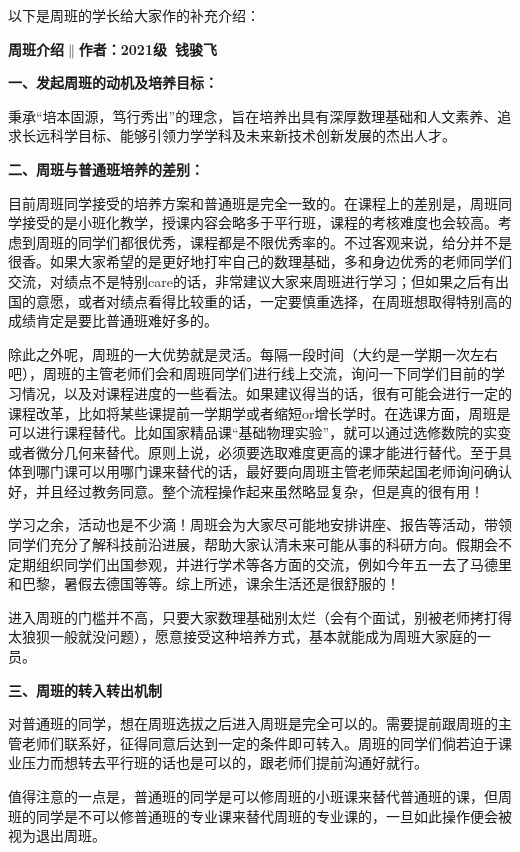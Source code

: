 \documentclass[11pt,oneside]{book}
\begin{document}
以下是周班的学长给大家作的补充介绍：

\textbf{周班介绍$\parallel$作者：2021级\ 钱骏飞}

\textbf{\textbf{一、发起周班的动机及培养目标：}}

秉承“培本固源，笃行秀出”的理念，旨在培养出具有深厚数理基础和人文素养、追求长远科学目标、能够引领力学学科及未来新技术创新发展的杰出人才。

\textbf{\textbf{二、周班与普通班培养的差别：}}

目前周班同学接受的培养方案和普通班是完全一致的。在课程上的差别是，周班同学接受的是小班化教学，授课内容会略多于平行班，课程的考核难度也会较高。考虑到周班的同学们都很优秀，课程都是不限优秀率的。不过客观来说，给分并不是很香。如果大家希望的是更好地打牢自己的数理基础，多和身边优秀的老师同学们交流，对绩点不是特别care的话，非常建议大家来周班进行学习；但如果之后有出国的意愿，或者对绩点看得比较重的话，一定要慎重选择，在周班想取得特别高的成绩肯定是要比普通班难好多的。

除此之外呢，周班的一大优势就是灵活。每隔一段时间（大约是一学期一次左右吧），周班的主管老师们会和周班同学们进行线上交流，询问一下同学们目前的学习情况，以及对课程进度的一些看法。如果建议得当的话，很有可能会进行一定的课程改革，比如将某些课提前一学期学或者缩短or增长学时。在选课方面，周班是可以进行课程替代。比如国家精品课“基础物理实验”，就可以通过选修数院的实变或者微分几何来替代。原则上说，必须要选取难度更高的课才能进行替代。至于具体到哪门课可以用哪门课来替代的话，最好要向周班主管老师荣起国老师询问确认好，并且经过教务同意。整个流程操作起来虽然略显复杂，但是真的很有用！

学习之余，活动也是不少滴！周班会为大家尽可能地安排讲座、报告等活动，带领同学们充分了解科技前沿进展，帮助大家认清未来可能从事的科研方向。假期会不定期组织同学们出国参观，并进行学术等各方面的交流，例如今年五一去了马德里和巴黎，暑假去德国等等。综上所述，课余生活还是很舒服的！

进入周班的门槛并不高，只要大家数理基础别太烂（会有个面试，别被老师拷打得太狼狈一般就没问题），愿意接受这种培养方式，基本就能成为周班大家庭的一员。

\textbf{\textbf{三、周班的转入转出机制}}

对普通班的同学，想在周班选拔之后进入周班是完全可以的。需要提前跟周班的主管老师们联系好，征得同意后达到一定的条件即可转入。周班的同学们倘若迫于课业压力而想转去平行班的话也是可以的，跟老师们提前沟通好就行。

值得注意的一点是，普通班的同学是可以修周班的小班课来替代普通班的课，但周班的同学是不可以修普通班的专业课来替代周班的专业课的，一旦如此操作便会被视为退出周班。
\end{document}
